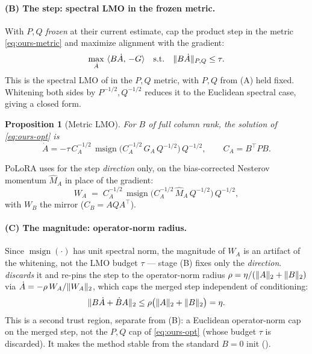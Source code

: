 \documentclass[11pt]{article}
\DeclarePairedDelimiter{\norm}{\lVert}{\rVert}
\DeclareMathOperator{\polar}{msign}          %
\newcommand{\methodname}{PoLoRA\xspace}
\theoremstyle{plain}
\newtheorem{proposition}{Proposition}
\theoremstyle{definition}
\theoremstyle{remark}
\begin{document}
\paragraph{(B) The step: spectral LMO in the frozen metric.} With $P,Q$ \emph{frozen} at their current estimate, cap the product step in the metric \eqref{eq:ours-metric} and maximize alignment with the gradient:
\begin{equation}
  \max_{\dot A}\ \langle B\dot A,\,-G\rangle
  \quad\text{s.t.}\quad
  \norm{B\dot A}_{P,Q}\le\tau .
  \label{eq:ours-opt}
\end{equation}
This is the spectral LMO of  in the $P,Q$ metric, with $P,Q$ from (A) held fixed. Whitening both sides by $P^{-1/2},Q^{-1/2}$ reduces it to the Euclidean spectral case, giving a closed form.
\begin{proposition}[Metric LMO]\label{prop:ours}
For $B$ of full column rank, the solution of \eqref{eq:ours-opt} is
\begin{equation*}
  \dot A = -\tau\,C_A^{-1/2}\,\polar\!\big(C_A^{-1/2}\,G_A\,Q^{-1/2}\big)\,Q^{-1/2},
  \qquad C_A=B^\top P B .
\end{equation*}
\end{proposition}
\medskip
\noindent \methodname{} uses  for the step \emph{direction} only, on the bias-corrected Nesterov momentum $\hat M_A$ in place of the gradient:
\begin{equation}
  W_A \;=\; C_A^{-1/2}\,\polar\!\big(C_A^{-1/2}\,\hat M_A\,Q^{-1/2}\big)\,Q^{-1/2},
  \label{eq:ours-lmo}
\end{equation}
with $W_B$ the mirror ($C_B=AQA^\top$).

\paragraph{(C) The magnitude: operator-norm radius.} Since $\polar(\cdot)$ has unit spectral norm, the magnitude of $W_A$ is an artifact of the whitening, not the LMO budget $\tau$ --- stage (B) fixes only the \emph{direction}.  \emph{discards} it and re-pins the step to the operator-norm radius $\rho=\eta/(\norm{A}_2+\norm{B}_2)$ via $\dot A=-\rho\,W_A/\norm{W_A}_2$, which caps the merged step independent of conditioning:
\begin{equation}
  \norm{B\dot A+\dot B A}_2\le\rho\big(\norm{A}_2+\norm{B}_2\big)=\eta .
  \label{eq:ours-prodcap}
\end{equation}
This is a second trust region, separate from (B): a Euclidean operator-norm cap on the merged step, not the $P,Q$ cap of \eqref{eq:ours-opt} (whose budget $\tau$ is discarded). It makes the method stable from the standard $B{=}0$ init ().
\end{document}
